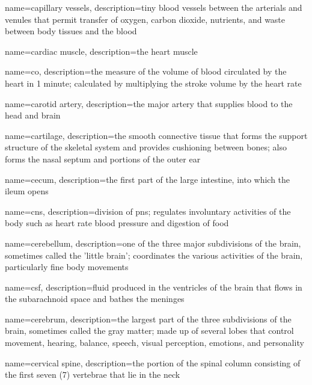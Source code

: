 \documentclass[../../EMT-169.tex]{subfiles}
\begin{document}
	{
		name=capillary vessels,
		description={tiny blood vessels between the arterials and venules that permit transfer of oxygen, carbon dioxide, nutrients, and waste between body tissues and the blood}
	}
	
	{
		name=cardiac muscle,
		description={the heart muscle}
	}

	{
		name=\acrfull{co},
		description={the measure of the volume of blood circulated by the heart in 1 minute; calculated by multiplying the stroke volume by the heart rate}
	}

	{
		name=carotid artery,
		description={the major artery that supplies blood to the head and brain}
	}

	{
		name=cartilage,
		description={the smooth connective tissue that forms the support structure of the skeletal system and provides cushioning between bones; also forms the nasal septum and portions of the outer ear}
	}

	{
		name=cecum,
		description={the first part of the large intestine, into which the ileum opens}
	}

	{
		name=\acrfull{cns},
		description={division of \acrlong{pns}; regulates involuntary activities of the body such as heart rate blood pressure and digestion of food}
	}

	{
		name=cerebellum,
		description={one of the three major subdivisions of the brain, sometimes called the 'little brain'; coordinates the various activities of the brain, particularly fine body movements}
	}

	{
		name=\acrlong{csf},
		description={fluid produced in the ventricles of the brain that flows in the subarachnoid space and bathes the meninges}
	}

	{
		name=cerebrum,
		description={the largest part of the three subdivisions of the brain, sometimes called the gray matter; made up of several lobes that control movement, hearing, balance, speech, visual perception, emotions, and personality}
	}

	{
		name=cervical spine,
		description={the portion of the spinal column consisting of the first seven (7) vertebrae that lie in the neck}
	}
\end{document}
